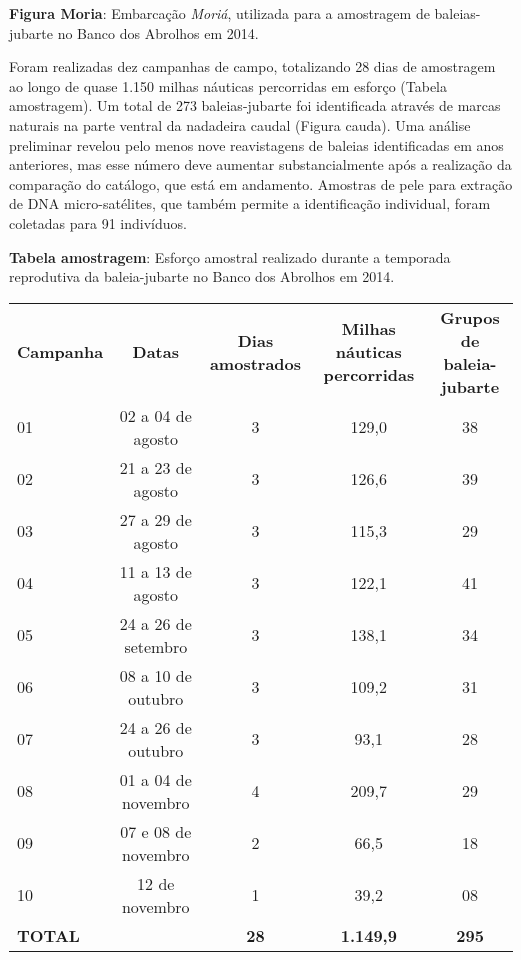 \textbf{Figura Moria}: Embarcação \textit{Moriá}, utilizada para a amostragem de baleias-jubarte no Banco dos Abrolhos em 2014.

Foram realizadas dez campanhas de campo, totalizando 28 dias de amostragem ao longo de quase 1.150 milhas náuticas percorridas em esforço (Tabela amostragem). Um total de 273 baleias-jubarte foi identificada através de marcas naturais na parte ventral da nadadeira caudal (Figura cauda). Uma análise preliminar revelou pelo menos nove reavistagens de baleias identificadas em anos anteriores, mas esse número deve aumentar substancialmente após a realização da comparação do catálogo, que está em andamento. Amostras de pele para extração de DNA micro-satélites, que também permite a identificação individual, foram coletadas para 91 indivíduos.

\textbf{Tabela amostragem}: Esforço amostral realizado durante a temporada reprodutiva da baleia-jubarte no Banco dos Abrolhos em 2014.  

\begin{tabular}{lcccc}  
\textbf{Campanha} & \textbf{Datas} & \textbf{Dias amostrados} & \textbf{Milhas náuticas percorridas} & \textbf{Grupos de baleia-jubarte} \\
01 & 02 a 04 de agosto & 3 & 129,0 & 38 \\
02 & 21 a 23 de agosto & 3 & 126,6 & 39 \\
03 & 27 a 29 de agosto & 3 & 115,3 & 29 \\
04 & 11 a 13 de agosto & 3 & 122,1 & 41 \\
05 & 24 a 26 de setembro & 3 & 138,1 & 34 \\
06 & 08 a 10 de outubro & 3 & 109,2 & 31 \\
07 & 24 a 26 de outubro & 3 & 93,1 & 28 \\
08 & 01 a 04 de novembro & 4 & 209,7 & 29 \\
09 & 07 e 08 de novembro & 2 & 66,5 & 18 \\
10 & 12 de novembro & 1 & 39,2 & 08 \\
\textbf{TOTAL} & & \textbf{28} & \textbf{1.149,9} & \textbf{295} \\
\end{tabular}    
